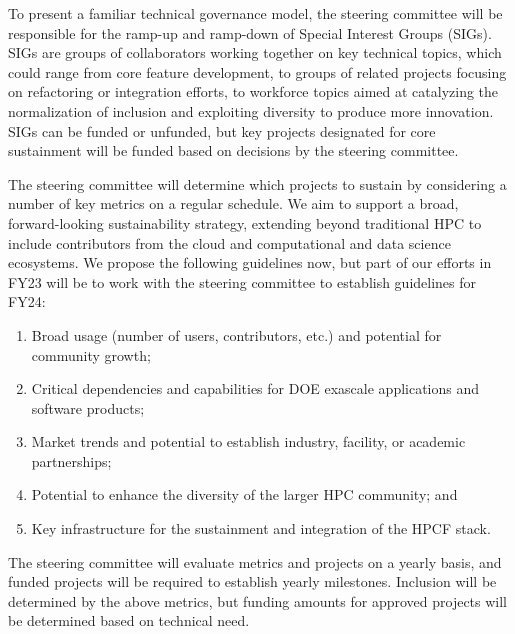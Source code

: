 \documentclass[11pt]{article}
\begin{document}

To present a familiar technical governance model, the steering committee will be
responsible for the ramp-up and ramp-down of Special Interest Groups (SIGs). SIGs are
groups of collaborators working together on key technical topics, which could
range from core feature development, to groups of related projects focusing on
refactoring or integration efforts, to workforce topics aimed at catalyzing the
normalization of inclusion and exploiting diversity to produce more innovation. SIGs can
be funded or unfunded, but key projects designated for core sustainment will be funded
based on decisions by the steering committee.

The steering committee will determine which projects to sustain by considering a number
of key metrics on a regular schedule. We aim to support a broad, forward-looking
sustainability strategy, extending beyond traditional HPC to include contributors from
the cloud and computational and data science ecosystems. We propose the
following guidelines now, but part of our efforts in FY23 will be to work with the
steering committee to establish guidelines for FY24:

\begin{enumerate}
\item Broad usage (number of users, contributors, etc.) and potential for community
  growth;
\item Critical dependencies and capabilities for DOE exascale applications and software
  products;
\item Market trends and potential to establish industry, facility, or academic
  partnerships;
\item Potential to enhance the diversity of the larger HPC community;
  and
\item Key infrastructure for the sustainment and integration of the HPCF stack.
\end{enumerate}

The steering committee will evaluate metrics and projects on a yearly basis, and funded
projects will be required to establish yearly milestones.
Inclusion will be determined by the above metrics, but funding amounts for approved
projects will be determined based on technical need.
\end{document}
